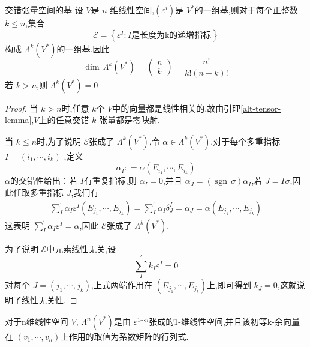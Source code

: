 \documentclass[../../几何与拓扑.tex]{subfiles}
\begin{document}
\begin{proposition}{交错张量空间的基}
    设 $ V $是 $ n $-维线性空间,$ \left( \varepsilon^{i} \right)  $是 $ V^{*} $的一组基,则对于每个正整数 $ k \le n $,集合 $$
    \mathscr{E} = \left\{  \varepsilon^{I}: I\text{是长度为k的递增指标} \right\}
    $$构成 $ \Lambda^{k}\left( V^{*} \right)  $的一组基.因此 $$
    \operatorname{dim}\,\Lambda^{k}\left( V^{*} \right) = \begin{pmatrix} 
        n\\ 
         k 
    \end{pmatrix} =  \frac{n! }{ k!\left( n-k \right)!  }   
    $$若 $ k >n $,则 $ \Lambda^{k}\left( V^{*} \right)=0  $        
\end{proposition}

\begin{proof}
    当 $ k >n $时,任意 $ k $个 $ V $中的向量都是线性相关的,故由引理\ref{alt-tensor-lemma},$ V $上的任意交错 $ k $-张量都是零映射.
    
    当 $ k \le n $时,为了说明 $ \mathscr{E} $张成了 $ \Lambda^{k}\left( V^{*} \right)  $,令 $ \alpha \in  \Lambda^{k}\left( V^{*} \right)  $.对于每个多重指标 $ I = \left( i_1,\cdots ,i_{k} \right)  $  ,定义 $$
    \alpha_{I}: = \alpha\left( E_{i_1},\cdots ,E_{i_{k}} \right) 
    $$ $ \alpha $的交错性给出：若 $ I  $有重复指标,则 $ \alpha_{I}=0 $,并且 $ \alpha_{J} = \left( \operatorname{sgn}\,\sigma \right) \alpha_{I}  $,若 $ J= I_{}\sigma $,因此任取多重指标 $ J $,我们有  $$
    \begin{aligned}
     \sum_{I}^{\prime} \alpha_{I} \varepsilon^{I}\left( E_{j_1},\cdots ,E_{j_{k}} \right)  = \sum_{I}^{\prime} \alpha_{I}\delta_{J}^{I}= \alpha_{J} = \alpha\left( E_{j_1},\cdots ,E_{j_{k}} \right) 
    \end{aligned}
    $$这表明 $ \sum_{I} ^{\prime} \alpha_{I} \varepsilon^{I} = \alpha $,因此 $ \mathscr{E} $张成了 $ \Lambda^{k}\left( V^{*} \right)  $.
    
    为了说明 $ \mathscr{E} $中元素线性无关,设 $$
    \sum_{I}^{\prime} k_{I}\varepsilon^{I} = 0
    $$ 对每个 $ J=\left( j_1,\cdots ,j_{k} \right)  $,上式两端作用在 $ \left( E_{j_1},\cdots ,E_{j_{k}} \right)  $上,即可得到 $ k_J  = 0$,这就说明了线性无关性.   
\end{proof}
\begin{corollary}\label{top-tensor-space}
    对于n维线性空间 $ V $, $ \Lambda^{n}\left( V^{*} \right)  $是由 $ \varepsilon^{1\cdots n} $张成的1-维线性空间,并且该初等k-余向量在 $ \left( v_1,\cdots ,v_{n} \right)  $上作用的取值为系数矩阵的行列式.    
\end{corollary}
\end{document}
